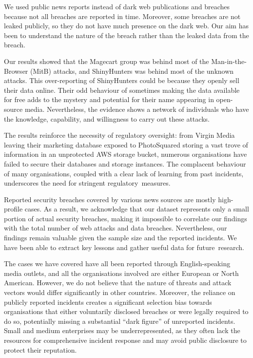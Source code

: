 We used public news reports instead of dark web publications and breaches because not all breaches are reported in time. Moreover, some breaches are not leaked publicly, so they do not have much presence on the dark web. Our aim has been to understand the nature of the breach rather than the leaked data from the breach.

Our results showed that the Magecart group was behind most of the Man-in-the-Browser (MitB) attacks, and ShinyHunters was behind most of the unknown attacks. This over-reporting of ShinyHunters could be because they openly sell their data online. Their odd behaviour of sometimes making the data available for free adds to the mystery and potential for their name appearing in open-source media. Nevertheless, the evidence shows a network of individuals who have the knowledge, capability, and willingness to carry out these attacks.

The results reinforce the necessity of regulatory oversight: from Virgin Media leaving their marketing database exposed to PhotoSquared storing a vast trove of information in an unprotected AWS storage bucket, numerous organisations have failed to secure their databases and storage instances. The complacent behaviour of many organisations, coupled with a clear lack of learning from past incidents, underscores the need for stringent regulatory~measures.

Reported security breaches covered by various news sources are mostly high-profile cases. As a result, we acknowledge that our dataset represents only a small portion of actual security breaches, making it impossible to correlate our findings with the total number of web attacks and data breaches. Nevertheless, our findings remain valuable given the sample size and the reported incidents. We have been able to extract key lessons and gather useful data for future~research.

The cases we have covered have all been reported through English-speaking media outlets, and all the organisations involved are either European or North American. However, we do not believe that the nature of threats and attack vectors would differ significantly in other countries. Moreover, the reliance on publicly reported incidents creates a significant selection bias towards organisations that either voluntarily disclosed breaches or were legally required to do so, potentially missing a substantial ``dark figure'' of unreported incidents. Small and medium enterprises may be underrepresented, as they often lack the resources for comprehensive incident response and may avoid public disclosure to protect their reputation.

